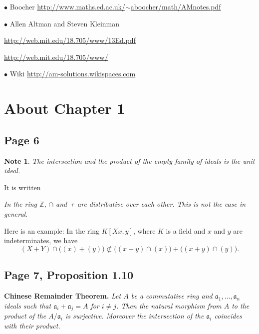 \documentclass[parskip=half,fontsize=12pt]{scrartcl}%
\newcommand{\mf}{\mathfrak}
\newcommand{\aaa}{\mf a}
\newcommand{\bu}{\bullet}
\newtheorem{note}[thm]{Note}
\begin{document}
$\bu$ Boocher \href{http://www.maths.ed.ac.uk/~aboocher/math/AMnotes.pdf}{\small http://www.maths.ed.ac.uk/$\sim$aboocher/math/AMnotes.pdf}

$\bu$ Allen Altman and Steven Kleinman %

\href{http://web.mit.edu/18.705/www/13Ed.pdf}{http://web.mit.edu/18.705/www/13Ed.pdf}

\href{http://web.mit.edu/18.705/www/}{http://web.mit.edu/18.705/www/}

$\bu$ Wiki \href{http://am-solutions.wikispaces.com}{http://am-solutions.wikispaces.com}

\section{About Chapter 1}

\subsection{Page 6}%

\begin{note}\label{ef}
The intersection and the product of the empty family of ideals is the unit ideal.
\end{note}

It is written

\emph{In the ring $\mathbb Z$, $\cap$ and + are distributive over each other. This is not the case in general.}

Here is an example: In the ring $K[Xx,y]$, where $K$ is a field and $x$ and $y$ are indeterminates, we have 
$$
(X+Y)\cap\Big((x)+(y)\Big)\not\subset\Big((x+y)\cap (x)\Big)+\Big((x+y)\cap (y)\Big).
$$

\subsection{Page 7, Proposition 1.10}%

\textbf{Chinese Remainder Theorem.} \emph{Let $A$ be a commutative ring and $\aaa_1,\dots,\aaa_n$ ideals such that $\aaa_i+\aaa_j=A$ for $i\not=j$. Then the natural morphism from $A$ to the product of the $A/\aaa_i$ is surjective. Moreover the intersection of the $\aaa_i$ coincides with their product.}
\end{document}
